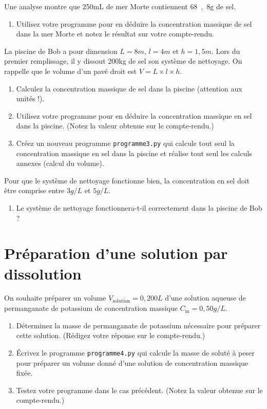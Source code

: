 Une analyse montre que \unit{250}{mL} de mer Morte contiennent \unit{68{,}8}{g} de sel.
\begin{enumerate}[resume]
\item \rea Utilisez votre programme pour en déduire la concentration massique de sel dans la mer Morte et notez le résultat sur votre compte-rendu.
\end{enumerate}

La piscine de Bob a pour dimension $L = \unit{8}{m}$, $l = \unit{4}{m}$ et $h=\unit{1{,}5}{m}$.
Lors du premier remplissage, il y dissout \unit{200}{kg} de sel son système de nettoyage.
On rappelle que le volume d'un pavé droit est $V=L\times l\times h$.
\begin{enumerate}[resume]
\item \rea{} Calculez la concentration massique de sel dans la piscine (attention aux unités !).
\item \rea{} \val{} Utilisez votre programme pour en déduire la concentration massique en sel dans la piscine.
(Notez la valeur obtenue sur le compte-rendu.)

\item \app{} \com{} Créez un nouveau programme \texttt{programme3.py} qui calcule tout seul la concentration massique en sel dans la piscine et réalise tout seul les calculs annexes (calcul du volume).
\end{enumerate}
Pour que le système de nettoyage fonctionne bien, la concentration en sel doit être comprise entre $\unit{3}{g/L}$ et $\unit{5}{g/L}$.
\begin{enumerate}[resume]
\item \val{} Le système de nettoyage fonctionnera-t-il correctement dans la piscine de Bob ?
\end{enumerate}

\section*{Préparation d'une solution par dissolution}

On souhaite préparer un volume $V_\mathrm{solution} = \unit{0{,}200}{L}$ d'une solution aqueuse de permanganate de potassium de concentration massique $C_\mathrm{m} = \unit{0{,}50}{g/L}$.
\begin{enumerate}[resume]
\item \rea{} Déterminez la masse de permanganate de potassium nécessaire pour préparer cette solution.
(Rédigez votre réponse sur le compte-rendu.)
\item \com{} Écrivez le programme \texttt{programme4.py} qui calcule la masse de soluté à peser pour préparer un volume donné d'une solution de concentration massique fixée.
\item \val{} Testez votre programme dans le cas précédent.
(Notez la valeur obtenue sur le compte-rendu.)
\end{enumerate}

